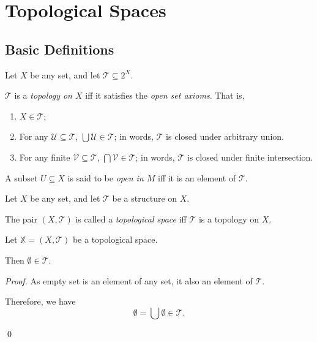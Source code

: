 \chapter{Topological Spaces}


\section{Basic Definitions}


\begin{definition}
	\label{def: open set axioms}
	Let $X$ be any set, and let $\mathcal T \subseteq 2^X$.
	
	$\mathcal T$ is a \textit{topology on $X$} iff it satisfies the \textit{open set axioms}. That is,
	\begin{enumerate}[\bfseries O1.]
		\item $X \in \mathcal T$;
		\item For any $\mathcal U \subseteq \mathcal T$, $\bigcup \mathcal U \in \mathcal T$; in words, $\mathcal T$ is closed under arbitrary union.
		\item For any finite $\mathcal V \subseteq \mathcal T$, $\bigcap \mathcal V \in \mathcal T$; in words, $\mathcal T$ is closed under finite intersection.
	\end{enumerate}
	
	A subset $U \subseteq X$ is said to be \textit{open in $M$} iff it is an element of $\mathcal T$.
\end{definition}


\begin{definition}
	\label{def: topological space}
	Let $X$ be any set, and let $\mathcal T$ be a structure on $X$.
	
	The pair $(X, \mathcal T)$ is called a \textit{topological space} iff $\mathcal T$ is a topology on $X$.
\end{definition}


\begin{proposition}
	\label{prop: empty set is an element of topology}
	Let $\mathbb X = (X, \mathcal T)$ be a topological space.
	
	Then $\emptyset \in \mathcal T$.
	
	\begin{proof}
		As empty set is an element of any set, it also an element of $\mathcal T$.
		
		Therefore, we have
		$$
		\emptyset = \bigcup \emptyset \in \mathcal T.
		$$
		
		\qed
	\end{proof}
\end{proposition}


